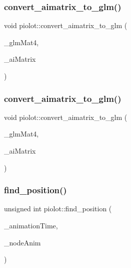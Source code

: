 \mbox{\label{namespacepiolot_a2458e8951ed1473d866e7a5567a3342a}} 
\subsubsection{\texorpdfstring{convert\+\_\+aimatrix\+\_\+to\+\_\+glm()}{convert\_aimatrix\_to\_glm()}\hspace{0.1cm}{\footnotesize\ttfamily [1/2]}}
{\footnotesize\ttfamily void piolot\+::convert\+\_\+aimatrix\+\_\+to\+\_\+glm (\begin{DoxyParamCaption}\item[{glm\+::mat4 \&}]{\+\_\+glm\+Mat4,  }\item[{const ai\+Matrix4x4 \&}]{\+\_\+ai\+Matrix }\end{DoxyParamCaption})}

\mbox{\label{namespacepiolot_a3ccd1d151ed200e3777ef66fae46f2cf}} 
\subsubsection{\texorpdfstring{convert\+\_\+aimatrix\+\_\+to\+\_\+glm()}{convert\_aimatrix\_to\_glm()}\hspace{0.1cm}{\footnotesize\ttfamily [2/2]}}
{\footnotesize\ttfamily void piolot\+::convert\+\_\+aimatrix\+\_\+to\+\_\+glm (\begin{DoxyParamCaption}\item[{glm\+::mat4 \&}]{\+\_\+glm\+Mat4,  }\item[{const ai\+Matrix3x3 \&}]{\+\_\+ai\+Matrix }\end{DoxyParamCaption})}

\mbox{\label{namespacepiolot_aec1ad7fb84906e9bbeb5f140d8b9a0b6}} 
\subsubsection{\texorpdfstring{find\+\_\+position()}{find\_position()}}
{\footnotesize\ttfamily unsigned int piolot\+::find\+\_\+position (\begin{DoxyParamCaption}\item[{float}]{\+\_\+animation\+Time,  }\item[{const ai\+Node\+Anim $\ast$}]{\+\_\+node\+Anim }\end{DoxyParamCaption})}

